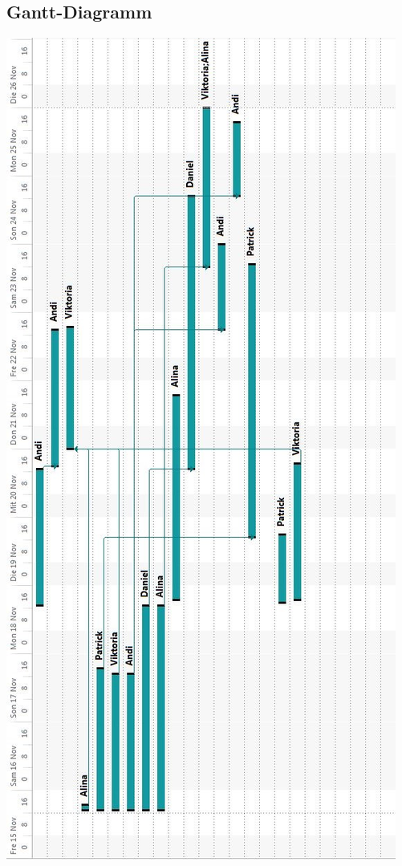\documentclass{article}
\begin{document}
\subsection{Gantt-Diagramm}
\includegraphics[scale=0.7]{Gantt}
\end{document}
